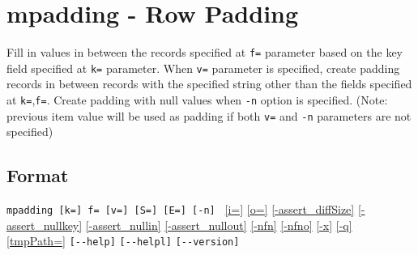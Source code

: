 %

\section{mpadding - Row Padding\label{sect:mpadding}}

Fill in values in between the records specified at \verb|f=| parameter based on the key field specified at \verb|k=| parameter. When \verb|v=| parameter is specified, create  padding records in between records with the specified string other than the fields specified at \verb|k=|,\verb|f=|. Create padding with null values when \verb|-n| option is specified. (Note: previous item value will be used as padding if both \verb|v=| and \verb|-n| parameters are not specified) 
   

\subsection*{Format}
\verb|mpadding [k=] f= [v=] [S=] [E=] [-n] | 
\hyperref[sect:option_i]{[i=]}
\hyperref[sect:option_o]{[o=]}
\hyperref[sect:option_assert_diffSize]{[-assert\_diffSize]}
\hyperref[sect:option_assert_nullkey]{[-assert\_nullkey]}
\hyperref[sect:option_assert_nullin]{[-assert\_nullin]}
\hyperref[sect:option_assert_nullout]{[-assert\_nullout]}
\hyperref[sect:option_nfn]{[-nfn]} 
\hyperref[sect:option_nfno]{[-nfno]}  
\hyperref[sect:option_x]{[-x]}
\hyperref[sect:option_x]{[-q]}
\hyperref[sect:option_option_tmppath]{[tmpPath=]}
\verb|[--help]|
\verb|[--helpl]|
\verb|[--version]|\\


